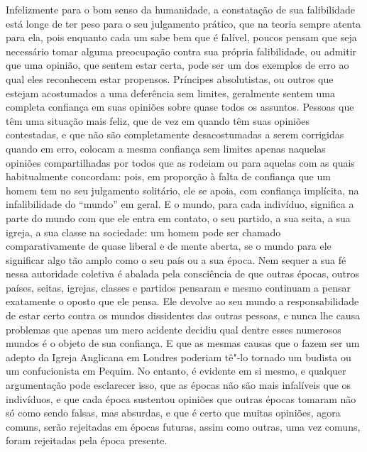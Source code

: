 Infelizmente para o bom senso da humanidade, a constatação de sua falibilidade
está longe de ter peso para o seu julgamento prático, que na
teoria sempre atenta para ela, pois enquanto cada um sabe bem que é
falível, poucos pensam que seja necessário tomar alguma preocupação contra
sua própria falibilidade, ou admitir que uma opinião, que sentem
estar certa, pode ser um dos exemplos de erro ao qual eles
reconhecem estar propensos. Príncipes absolutistas, ou outros que
estejam acostumados a uma deferência sem limites, geralmente sentem uma
completa confiança em suas opiniões sobre quase todos os assuntos. Pessoas
que têm uma situação mais feliz, que de vez em quando têm suas opiniões
contestadas, e que não são completamente desacostumadas a serem
corrigidas quando em erro, colocam a mesma confiança sem limites apenas
naquelas opiniões compartilhadas por todos que as rodeiam ou para
aquelas com as quais habitualmente concordam: pois, em proporção à
falta de confiança que um homem tem no seu julgamento solitário, ele se
apoia, com confiança implícita, na infalibilidade do ``mundo'' em geral.
E o mundo, para cada indivíduo, significa a parte do mundo com que ele entra
em contato, o seu partido, a sua seita, a sua igreja, a sua classe na
sociedade: um homem pode ser chamado comparativamente de quase liberal e
de mente aberta, se o mundo para ele significar algo tão amplo como o seu
país ou a sua época. Nem sequer a sua fé nessa autoridade coletiva é abalada
pela consciência de que outras épocas, outros países, seitas, igrejas,
classes e partidos pensaram e mesmo continuam a pensar exatamente o
oposto que ele pensa. Ele devolve ao seu mundo a responsabilidade de \mbox{estar}
certo contra os mundos dissidentes das outras pessoas, e nunca lhe
causa problemas que apenas um mero acidente decidiu qual dentre esses
numerosos mundos é o objeto de sua confiança. E que as mesmas causas
que o fazem ser um adepto da Igreja Anglicana em Londres poderiam
tê"-lo tornado um budista ou um confucionista em Pequim. No entanto, é
evidente em si mesmo, e qualquer argumentação pode esclarecer isso, que
as épocas não são mais infalíveis que os indivíduos, e que cada época
sustentou opiniões que outras épocas tomaram não só como sendo falsas,
mas absurdas, e que é certo que muitas opiniões, agora comuns, serão
rejeitadas em épocas futuras, assim como outras, uma vez comuns, foram
rejeitadas pela época presente. 

